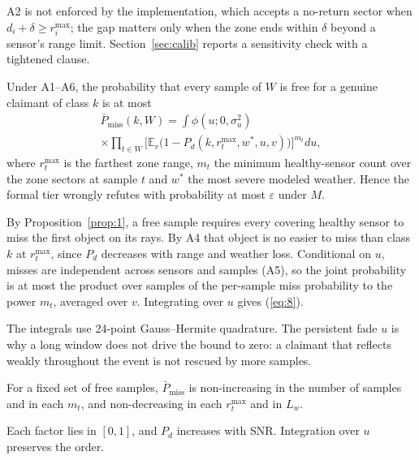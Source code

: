 A2 is not enforced by the implementation, which accepts a no-return sector when $d_i + \delta \ge r_i^{\max}$; the gap matters only when the zone ends within $\delta$ beyond a sensor's range limit. Section~\ref{sec:calib} reports a sensitivity check with a tightened clause.

\begin{proposition}\label{prop:2}
Under A1--A6, the probability that every sample of $W$ is free for a genuine claimant of class $k$ is at most
\begin{multline}
\bar P_{\mathrm{miss}}(k, W) = \int \phi(u; 0, \sigma_u^2) \\
\times \prod_{t \in W} \Big[ \mathbb{E}_v\big(1 - P_d(k, r_t^{\max}, w^*, u, v)\big) \Big]^{m_t} du ,
\label{eq:8}
\end{multline}
where $r_t^{\max}$ is the farthest zone range, $m_t$ the minimum healthy-sensor count over the zone sectors at sample $t$ and $w^*$ the most severe modeled weather. Hence the formal tier wrongly refutes with probability at most $\varepsilon$ under $M$.
\end{proposition}
\begin{IEEEproof}
By Proposition~\ref{prop:1}, a free sample requires every covering healthy sensor to miss the first object on its rays. By A4 that object is no easier to miss than class $k$ at $r_t^{\max}$, since $P_d$ decreases with range and weather loss. Conditional on $u$, misses are independent across sensors and samples (A5), so the joint probability is at most the product over samples of the per-sample miss probability to the power $m_t$, averaged over $v$. Integrating over $u$ gives (\ref{eq:8}).
\end{IEEEproof}

The integrals use 24-point Gauss--Hermite quadrature. The persistent fade $u$ is why a long window does not drive the bound to zero: a claimant that reflects weakly throughout the event is not rescued by more samples.

\begin{proposition}\label{prop:3}
For a fixed set of free samples, $\bar P_{\mathrm{miss}}$ is non-increasing in the number of samples and in each $m_t$, and non-decreasing in each $r_t^{\max}$ and in $L_w$.
\end{proposition}
\begin{IEEEproof}
Each factor lies in $[0,1]$, and $P_d$ increases with SNR. Integration over $u$ preserves the order.
\end{IEEEproof}


